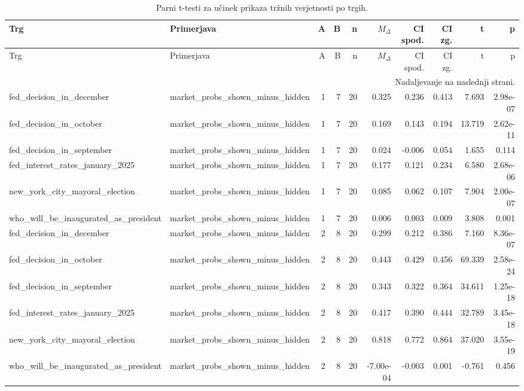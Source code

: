 \scriptsize
\setlength{\LTleft}{0pt}
\setlength{\LTright}{0pt}
\begin{longtable}{llrrrrrrrr}
\caption{Parni t-testi za učinek prikaza tržnih verjetnosti po trgih.}\label{tab:ttests-market-prob}\\
\toprule
Trg & Primerjava & A & B & n & $M_\Delta$ & CI spod. & CI zg. & t & p \\
\midrule
\endfirsthead
\toprule
Trg & Primerjava & A & B & n & $M_\Delta$ & CI spod. & CI zg. & t & p \\
\midrule
\endhead
\midrule
\multicolumn{10}{r}{Nadaljevanje na naslednji strani.} \\
\endfoot
\bottomrule
\endlastfoot
fed\_decision\_in\_december & market\_probs\_shown\_minus\_hidden & 1 & 7 & 20 & 0.325 & 0.236 & 0.413 & 7.693 & 2.98e-07 \\
fed\_decision\_in\_october & market\_probs\_shown\_minus\_hidden & 1 & 7 & 20 & 0.169 & 0.143 & 0.194 & 13.719 & 2.62e-11 \\
fed\_decision\_in\_september & market\_probs\_shown\_minus\_hidden & 1 & 7 & 20 & 0.024 & -0.006 & 0.054 & 1.655 & 0.114 \\
fed\_interest\_rates\_january\_2025 & market\_probs\_shown\_minus\_hidden & 1 & 7 & 20 & 0.177 & 0.121 & 0.234 & 6.580 & 2.68e-06 \\
new\_york\_city\_mayoral\_election & market\_probs\_shown\_minus\_hidden & 1 & 7 & 20 & 0.085 & 0.062 & 0.107 & 7.904 & 2.00e-07 \\
who\_will\_be\_inaugurated\_as\_president & market\_probs\_shown\_minus\_hidden & 1 & 7 & 20 & 0.006 & 0.003 & 0.009 & 3.808 & 0.001 \\
fed\_decision\_in\_december & market\_probs\_shown\_minus\_hidden & 2 & 8 & 20 & 0.299 & 0.212 & 0.386 & 7.160 & 8.36e-07 \\
fed\_decision\_in\_october & market\_probs\_shown\_minus\_hidden & 2 & 8 & 20 & 0.443 & 0.429 & 0.456 & 69.339 & 2.58e-24 \\
fed\_decision\_in\_september & market\_probs\_shown\_minus\_hidden & 2 & 8 & 20 & 0.343 & 0.322 & 0.364 & 34.611 & 1.25e-18 \\
fed\_interest\_rates\_january\_2025 & market\_probs\_shown\_minus\_hidden & 2 & 8 & 20 & 0.417 & 0.390 & 0.444 & 32.789 & 3.45e-18 \\
new\_york\_city\_mayoral\_election & market\_probs\_shown\_minus\_hidden & 2 & 8 & 20 & 0.818 & 0.772 & 0.864 & 37.020 & 3.55e-19 \\
who\_will\_be\_inaugurated\_as\_president & market\_probs\_shown\_minus\_hidden & 2 & 8 & 20 & -7.00e-04 & -0.003 & 0.001 & -0.761 & 0.456 \\

\end{longtable}
